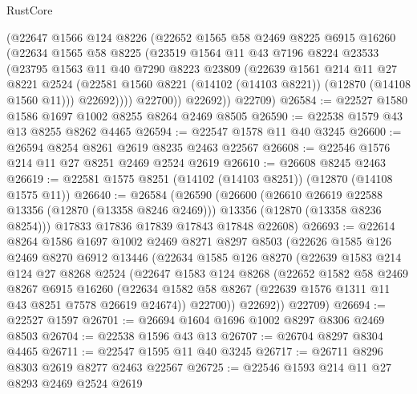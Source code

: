 \begin{lexlean}{RustCore}
\begin{coremodule}
          (@22647
            @1566
            @124
            @8226
            (@22652
              @1565
              @58
              @2469
              @8225
              @6915
              @16260
              (@22634
                @1565
                @58
                @8225
                (@23519
                  @1564
                  @11
                  @43
                  @7196
                  @8224
                  @23533
                  (@23795
                    @1563
                    @11
                    @40
                    @7290
                    @8223
                    @23809
                    (@22639
                      @1561
                      @214
                      @11
                      @27
                      @8221
                      @2524
                      (@22581 @1560 @8221 (@14102 (@14103 @8221)) (@12870 (@14108 @1560 @11)))
                      @22692))))
              @22700))
          @22692))
      @22709)
@26584 := @22527 @1580 @1586 @1697 @1002 @8255 @8264 @2469 @8505
@26590 := @22538 @1579 @43 @13 @8255 @8262 @4465
@26594 := @22547 @1578 @11 @40 @3245
@26600 := @26594 @8254 @8261 @2619 @8235 @2463 @22567
@26608 := @22546 @1576 @214 @11 @27 @8251 @2469 @2524 @2619
@26610 := @26608 @8245 @2463
@26619 := @22581 @1575 @8251 (@14102 (@14103 @8251)) (@12870 (@14108 @1575 @11))
@26640 := @26584
    (@26590
      (@26600
        (@26610 @26619 @22588 @13356 (@12870 (@13358 @8246 @2469)))
        @13356
        (@12870 (@13358 @8236 @8254)))
      @17833
      @17836
      @17839
      @17843
      @17848
      @22608)
@26693 := @22614
    @8264
    @1586
    @1697
    @1002
    @2469
    @8271
    @8297
    @8503
    (@22626
      @1585
      @126
      @2469
      @8270
      @6912
      @13446
      (@22634
        @1585
        @126
        @8270
        (@22639
          @1583
          @214
          @124
          @27
          @8268
          @2524
          (@22647
            @1583
            @124
            @8268
            (@22652
              @1582
              @58
              @2469
              @8267
              @6915
              @16260
              (@22634 @1582 @58 @8267 (@22639 @1576 @1311 @11 @43 @8251 @7578 @26619 @24674))
              @22700))
          @22692))
      @22709)
@26694 := @22527 @1597
@26701 := @26694 @1604 @1696 @1002 @8297 @8306 @2469 @8503
@26704 := @22538 @1596 @43 @13
@26707 := @26704 @8297 @8304 @4465
@26711 := @22547 @1595 @11 @40 @3245
@26717 := @26711 @8296 @8303 @2619 @8277 @2463 @22567
@26725 := @22546 @1593 @214 @11 @27 @8293 @2469 @2524 @2619

\end{coremodule}
\end{lexlean}
